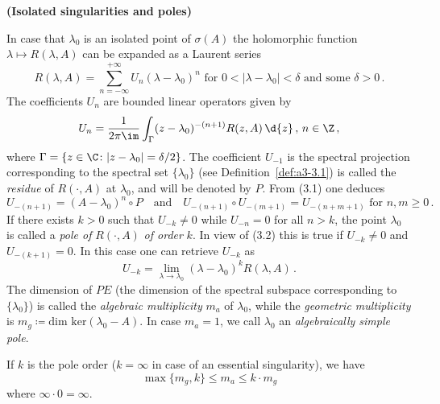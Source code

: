 \begin{example}{\textbf{(Isolated singularities and poles)}}\label{ex:a3-3.6}

In case that $\lambda_{0}$ is an isolated point of $\sigma(A)$ the holomorphic function $\lambda \mapsto R(\lambda,A)$ can be expanded as a Laurent series
\[
R(\lambda,A) = \sum_{n=-\infty}^{+\infty} U_{n}(\lambda - \lambda_{0})^{n} \text{ for } 0 < |\lambda - \lambda_{0}| < \delta \text{ and some } \delta > 0\,.
\]
The coefficients $U_{n}$ are bounded linear operators given by
\begin{equation}\label{eq:a3-3.1}
U_{n} = \frac{1}{2\pi\im }\int_{\Gamma} (z - \lambda_{0})^{-(n+1)}R(z,A) \, \d{z} \, , \, n \in \Z\,,
\end{equation}
where $\Gamma = \{z \in \C \colon |z - \lambda_{0}| = \delta/2\}$.
The coefficient $U_{-1}$ is the spectral projection corresponding to the spectral set $\{\lambda_{0}\}$ (see Definition~\ref{def:a3-3.1}) is called the \emph{residue} of $R(\cdot,A)$ at $\lambda_{0}$, and will be denoted by $P$.
From (3.1) one deduces
\begin{equation}\label{eq:a3-3.2}
U_{-(n+1)} = (A - \lambda_{0})^{n} \circ P \quad \text{and} \quad U_{-(n+1)} \circ U_{-(m+1)} = U_{-(n+m+1)} \text{ for } n, m \geq 0\,.
\end{equation}
If there exists $k > 0$ such that $U_{-k} \neq 0$ while $U_{-n} = 0$ for all $n > k$, the point $\lambda_{0}$ is called a \emph{pole of} $R(\cdot,A)$ \emph{of order} $k$.
In view of (3.2) this is true if $U_{-k} \neq 0$ and $U_{-(k+1)} = 0$.
In this case one can retrieve $U_{-k}$ as
\begin{equation}\label{eq:a3-3.3}
U_{-k} = \lim_{\lambda \to \lambda_{0}} (\lambda - \lambda_{0})^{k}R(\lambda,A)\,.
\end{equation}
The dimension of $PE$ (\ie the dimension of the spectral subspace corresponding to $\{\lambda_{0}\}$) is called the \emph{algebraic multiplicity} $m_{a}$ of $\lambda_{0}$, while the \emph{geometric multiplicity} is $m_{g} \coloneqq \text{dim ker}(\lambda_{0} - A)$.
In case $m_{a} = 1$, we call $\lambda_{0}$ an \emph{algebraically simple pole}.

If $k$ is the pole order ($k = \infty$ in case of an essential singularity), we have
\begin{equation}\label{eq:a3-3.4}
	\max\{m_{g},k\} \leq m_{a} \leq k \cdot m_{g}
\end{equation}
where $\infty \cdot 0 = \infty$.


\end{example}
